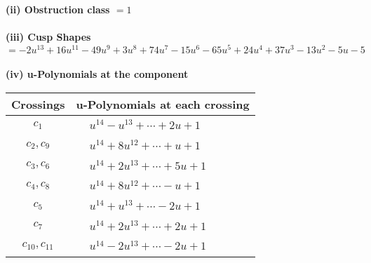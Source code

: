 \documentclass[1p]{elsarticle_modified}
\theoremstyle{definition}
\begin{document}
\flushleft \textbf{(ii) Obstruction class $= 1$}\\~\\
\flushleft \textbf{(iii) Cusp Shapes $= -2 u^{13}+16 u^{11}-49 u^9+3 u^8+74 u^7-15 u^6-65 u^5+24 u^4+37 u^3-13 u^2-5 u-5$}\\~\\
\newpage\renewcommand{\arraystretch}{1}
\flushleft \textbf{(iv) u-Polynomials at the component}\newline \\
\begin{tabular}{m{50pt}|m{274pt}}
Crossings & \hspace{64pt}u-Polynomials at each crossing \\
\hline $$\begin{aligned}c_{1}\end{aligned}$$&$\begin{aligned}
&u^{14}- u^{13}+\cdots+2 u+1
\end{aligned}$\\
\hline $$\begin{aligned}c_{2},c_{9}\end{aligned}$$&$\begin{aligned}
&u^{14}+8 u^{12}+\cdots+u+1
\end{aligned}$\\
\hline $$\begin{aligned}c_{3},c_{6}\end{aligned}$$&$\begin{aligned}
&u^{14}+2 u^{13}+\cdots+5 u+1
\end{aligned}$\\
\hline $$\begin{aligned}c_{4},c_{8}\end{aligned}$$&$\begin{aligned}
&u^{14}+8 u^{12}+\cdots- u+1
\end{aligned}$\\
\hline $$\begin{aligned}c_{5}\end{aligned}$$&$\begin{aligned}
&u^{14}+u^{13}+\cdots-2 u+1
\end{aligned}$\\
\hline $$\begin{aligned}c_{7}\end{aligned}$$&$\begin{aligned}
&u^{14}+2 u^{13}+\cdots+2 u+1
\end{aligned}$\\
\hline $$\begin{aligned}c_{10},c_{11}\end{aligned}$$&$\begin{aligned}
&u^{14}-2 u^{13}+\cdots-2 u+1
\end{aligned}$\\
\hline
\end{tabular}\\~\\
\end{document}
